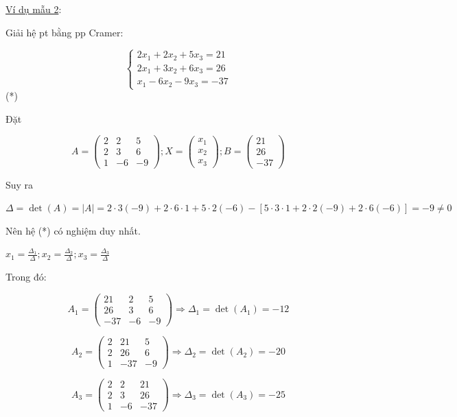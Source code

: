 \documentclass[
]{article}
\let\ul\uline
\begin{document}
\ul{Ví dụ mẫu 2}:

Giải hệ pt bằng pp Cramer:

$$\begin{cases} 2x_1 + 2x_2 + 5x_3 = 21 \\ 2x_1 + 3x_2 + 6x_3 = 26 \\ x_1 - 6x_2 - 9x_3 = -37 \end{cases}$$ (*)

Đặt

$$A = \begin{pmatrix} 2 & 2 & 5 \\ 2 & 3 & 6 \\ 1 & -6 & -9 \end{pmatrix}; X = \begin{pmatrix} x_1 \\ x_2 \\ x_3 \end{pmatrix}; B = \begin{pmatrix} 21 \\ 26 \\ -37 \end{pmatrix}$$

Suy ra

$\Delta = \det(A) = |A| = 2 \cdot 3(-9) + 2 \cdot 6 \cdot 1 + 5 \cdot 2(-6) - [5 \cdot 3 \cdot 1 + 2 \cdot 2(-9) + 2 \cdot 6(-6)] = -9 \neq 0$

Nên hệ (*) có nghiệm duy nhất.

$x_1 = \frac{\Delta_1}{\Delta}; x_2 = \frac{\Delta_2}{\Delta}; x_3 = \frac{\Delta_3}{\Delta}$

Trong đó:

$$A_1 = \begin{pmatrix} 21 & 2 & 5 \\ 26 & 3 & 6 \\ -37 & -6 & -9 \end{pmatrix} \Rightarrow \Delta_1 = \det(A_1) = -12$$

$$A_2 = \begin{pmatrix} 2 & 21 & 5 \\ 2 & 26 & 6 \\ 1 & -37 & -9 \end{pmatrix} \Rightarrow \Delta_2 = \det(A_2) = -20$$

$$A_3 = \begin{pmatrix} 2 & 2 & 21 \\ 2 & 3 & 26 \\ 1 & -6 & -37 \end{pmatrix} \Rightarrow \Delta_3 = \det(A_3) = -25$$
\end{document}

